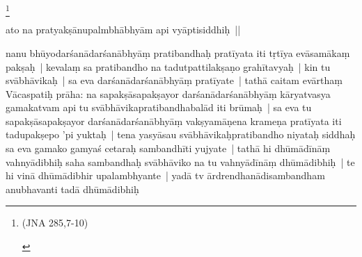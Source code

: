 \documentclass[article,12pt,a4paper]{memoir}%
\newcounter{parCount}
\begin{document}
	  
	  \footnote{\begin{english}(JNA 285,7-10)\end{english}}

	  
	  \pstart \leavevmode%
	ato na pratyakṣānupalmbhābhyām api vyāptisiddhiḥ ||
	{}
	\pend%
      
	  
	

	  
	  \pstart \leavevmode%
	\label{thakur75-45.30}nanu bhūyodarśanādarśanābhyāṃ pratibandhaḥ pratīyata iti tṛtīya evāsamākaṃ pakṣaḥ | kevalaṃ sa pratibandho na tadutpattilakṣaṇo grahītavyaḥ | kin tu svābhāvikaḥ | sa eva darśanādarśanābhyāṃ pratīyate | tathā caitam evārthaṃ Vācaspatiḥ prāha: na sapakṣāsapakṣayor \label{ratnakīrtinibandhāvali__36r1PF7IMVS4B46SOBOG8KXEGK8}darśanādarśanābhyāṃ\label{ratnakīrtinibandhāvali__36r1PF7IMVRB34ML6ZYATM1PHF2} kāryatvasya gamakatvam api tu svābhāvikapratibandhabalād iti brūmaḥ | sa eva tu sapakṣāsapakṣayor darśanādarśanābhyāṃ vakṣyamāṇena krameṇa pratīyata iti tadupakṣepo 'pi yuktaḥ | \label{sarit__ratnakīrtinibandhāvali__122689}tena yasyāsau \label{ratnakīrtinibandhāvali__36r1PF7IMVQJ1KWGQSXO9UY1JGL}svābhāvikaḥ\label{ratnakīrtinibandhāvali__36r1PF7IMVPPPG3TFIIZHIM3XZ4}pratibandho niyataḥ siddhaḥ sa eva gamako gamyaś cetaraḥ sambandhīti yujyate | tathā hi dhūmādīnāṃ vahnyādibhiḥ saha sambandhaḥ svābhāviko na tu vahnyādīnāṃ dhūmādibhiḥ | te hi vinā dhūmādibhir upalambhyante | yadā tv \label{ratnakīrtinibandhāvali__36r1PF7IMVOXKCE0O54J1VV68NX}ārdrendhanādisambandham\label{ratnakīrtinibandhāvali__36r1PF7IMVO3DAEZ0FQPWRJZXZ2} anubhavanti tadā dhūmādibhiḥ 
\end{document}
